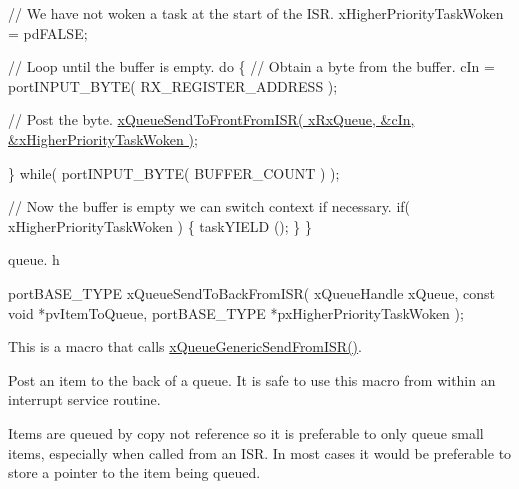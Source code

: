 \begin{DoxyPre}   // We have not woken a task at the start of the ISR.
   xHigherPriorityTaskWoken = pdFALSE;\end{DoxyPre}



\begin{DoxyPre}   // Loop until the buffer is empty.
   do
   \{
    // Obtain a byte from the buffer.
    cIn = portINPUT\_BYTE( RX\_REGISTER\_ADDRESS );\end{DoxyPre}



\begin{DoxyPre}    // Post the byte.
    \hyperlink{queue_8h_af03b83396462affe9e28302660e7b9c6}{xQueueSendToFrontFromISR( xRxQueue, &cIn, &xHigherPriorityTaskWoken )};\end{DoxyPre}



\begin{DoxyPre}   \} while( portINPUT\_BYTE( BUFFER\_COUNT ) );\end{DoxyPre}



\begin{DoxyPre}   // Now the buffer is empty we can switch context if necessary.
   if( xHigherPriorityTaskWoken )
   \{
    taskYIELD ();
   \}
\}
\end{DoxyPre}


queue. h 
\begin{DoxyPre}
portBASE\_TYPE xQueueSendToBackFromISR(
                                     xQueueHandle xQueue,
                                     const void *pvItemToQueue,
                                     portBASE\_TYPE *pxHigherPriorityTaskWoken
                                  );
\end{DoxyPre}


This is a macro that calls \hyperlink{queue_8h_a7f50aeaeff6fb3ae7d14387d6096ec67}{x\+Queue\+Generic\+Send\+From\+I\+S\+R()}.

Post an item to the back of a queue. It is safe to use this macro from within an interrupt service routine.

Items are queued by copy not reference so it is preferable to only queue small items, especially when called from an I\+SR. In most cases it would be preferable to store a pointer to the item being queued.



